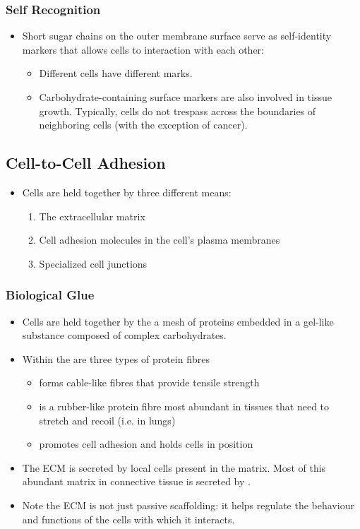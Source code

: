 \documentclass{article}
\numberwithin{equation}{section}
\begin{document}
\subsubsection{Self Recognition}
\begin{itemize}
    \item Short sugar chains on the outer membrane surface serve as self-identity markers that allows cells to interaction with each other:
    \begin{itemize}
        \item Different cells have different marks.
        \item Carbohydrate-containing surface markers are also involved in tissue growth. Typically, cells do not trespass across the boundaries of neighboring cells (with the exception of cancer).
    \end{itemize}
\end{itemize}
\subsection{Cell-to-Cell Adhesion}
\begin{itemize}
    \item Cells are held together by three different means:
    \begin{enumerate}
        \item The extracellular matrix
        \item Cell adhesion molecules in the cell's plasma membranes
        \item Specialized cell junctions
    \end{enumerate}
\end{itemize}
\subsubsection{Biological Glue}
\begin{itemize}
    \item Cells are held together by the  a mesh of proteins embedded in a gel-like substance composed of complex carbohydrates.
    \item Within the  are three types of protein fibres
    \begin{itemize}
        \item {} forms cable-like fibres that provide tensile strength
        \item {} is a rubber-like protein fibre most abundant in tissues that need to stretch and recoil (i.e. in lungs)
        \item {} promotes cell adhesion and holds cells in position
    \end{itemize}
    \item The ECM is secreted by local cells present in the matrix. Most of this abundant matrix in connective tissue is secreted by .
    \item Note the ECM is not just passive scaffolding: it helps regulate the behaviour and functions of the cells with which it interacts.
\end{itemize}
\end{document}
